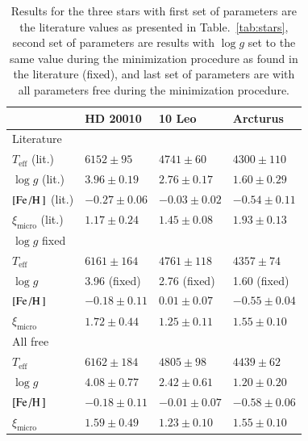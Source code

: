 \documentclass{aa}
\begin{document}
\begin{table}[htb!]
    \caption{Results for the three stars with first set of parameters are the
             literature values as presented in Table.~\ref{tab:stars}, second
             set of parameters are results with $\log g$ set to the same value
             during the minimization procedure as found in the literature
             (fixed), and last set of parameters are with all parameters free
             during the minimization procedure.}
    \label{tab:results}
    \centering
    \begin{tabular}{llll}
      \hline\hline
                                    & HD 20010          &  10 Leo           &  Arcturus        \\
      \hline
        Literature                  &                   &                   &                  \\
        $T_\mathrm{eff}$ (lit.)     & $6152 \pm  95$    &  $4741 \pm  60$   & $4300 \pm 110$   \\
        $\log g$ (lit.)             & $3.96 \pm 0.19$   &  $2.76 \pm 0.17$  & $1.60 \pm 0.29$  \\
        $[\ion{Fe}/\ion{H}]$ (lit.) & $-0.27 \pm 0.06$  &  $-0.03 \pm 0.02$ & $-0.54 \pm 0.11$ \\
        $\xi_\mathrm{micro}$ (lit.) & $1.17 \pm 0.24$   &  $1.45 \pm 0.08$  & $1.93 \pm 0.13$  \\
      \hline
        $\log g$ fixed              &                   &                   &                  \\
        $T_\mathrm{eff}$            & $6161 \pm 164$    &  $4761 \pm 118$   & $4357 \pm  74$   \\
        $\log g$                    & 3.96 (fixed)      &  2.76 (fixed)     & 1.60 (fixed)     \\
        $[\ion{Fe}/\ion{H}]$        & $-0.18 \pm 0.11$  &  $ 0.01 \pm 0.07$ & $-0.55 \pm 0.04$ \\
        $\xi_\mathrm{micro}$        & $1.72 \pm 0.44$   &  $1.25 \pm 0.11$  & $1.55 \pm 0.10$  \\
      \hline
        All free                    &                   &                   &                  \\
        $T_\mathrm{eff}$            & $6162 \pm 184$    &  $4805 \pm  98$   & $4439 \pm  62$   \\
        $\log g$                    & $4.08 \pm 0.77$   &  $2.42 \pm 0.61$  & $1.20 \pm 0.20$  \\
        $[\ion{Fe}/\ion{H}]$        & $-0.18 \pm 0.11$  &  $-0.01 \pm 0.07$ & $-0.58 \pm 0.06$ \\
        $\xi_\mathrm{micro}$        & $1.59 \pm 0.49$   &  $1.23 \pm 0.10$  & $1.55 \pm 0.10$  \\
        \hline\hline
    \end{tabular}
\end{table}
\end{document}
